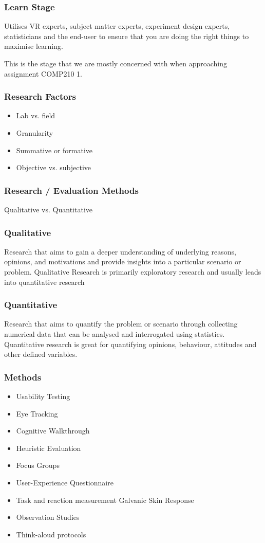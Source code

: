 \begin{frame}
	\frametitle{Learn Stage}
	Utilises VR experts, subject matter experts, experiment design experts, statisticians and the end-user to ensure that you are doing the right things to maximise learning. 
	
	\vspace{.2in}
	This is the stage that we are mostly concerned with when approaching assignment COMP210 1.
\end{frame}

\begin{frame}
	\frametitle{Research Factors}
	\begin{itemize}
		\item Lab vs. field
		\item Granularity
		\item Summative or formative
		\item Objective vs. subjective
	\end{itemize}
\end{frame}

\begin{frame}
	\frametitle{Research / Evaluation Methods}
	
	\huge Qualitative vs. Quantitative 
\end{frame}

\begin{frame}
	\frametitle{Qualitative}
	Research that aims to gain a deeper understanding of underlying reasons, opinions, and motivations and provide insights into a particular scenario or problem.  Qualitative Research is primarily exploratory research and usually leads into quantitative research 
	\end{frame}

\begin{frame}
	\frametitle{Quantitative}
	Research that aims to quantify the problem or scenario through collecting numerical data that can be analysed and interrogated using statistics. Quantitative research is great for quantifying opinions, behaviour, attitudes and other defined variables.
	\end{frame}	

\begin{frame}
	\frametitle{Methods}
	\begin{itemize}
		\item Usability Testing
		\item Eye Tracking
		\item Cognitive Walkthrough
		\item Heuristic Evaluation
		\item Focus Groups
		\item User-Experience Questionnaire
		\item Task and reaction measurement Galvanic Skin Response
		\item Observation Studies
		\item Think-aloud protocols
	\end{itemize}
\end{frame}

